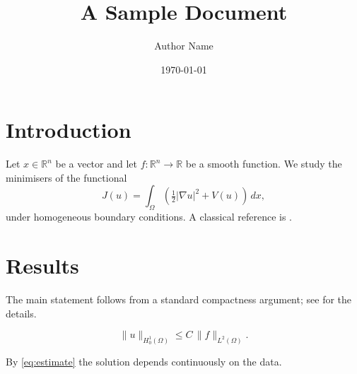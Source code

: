 \documentclass[11pt,a4paper]{article}
\title{A Sample Document}
\author{Author Name}
\date{\today}
\begin{document}
\maketitle

\section{Introduction}
Let $x \in \mathbb{R}^{n}$ be a vector and let $f \colon \mathbb{R}^{n} \to \mathbb{R}$ be a smooth
function. We study the minimisers of the functional
\[
  J(u) = \int_{\Omega} \left( \tfrac{1}{2} \lvert \nabla u \rvert^{2} + V(u) \right) \, dx,
\]
under homogeneous boundary conditions. A classical reference is \cite{evans1998}.

\section{Results}
The main statement follows from a standard compactness argument; see \cite{brezis2011}
for the details. %

\begin{equation}
  \lVert u \rVert_{H^{1}_{0}(\Omega)} \le C \, \lVert f \rVert_{L^{2}(\Omega)}.
  \label{eq:estimate}
\end{equation}

By \eqref{eq:estimate} the solution depends continuously on the data.
\end{document}
